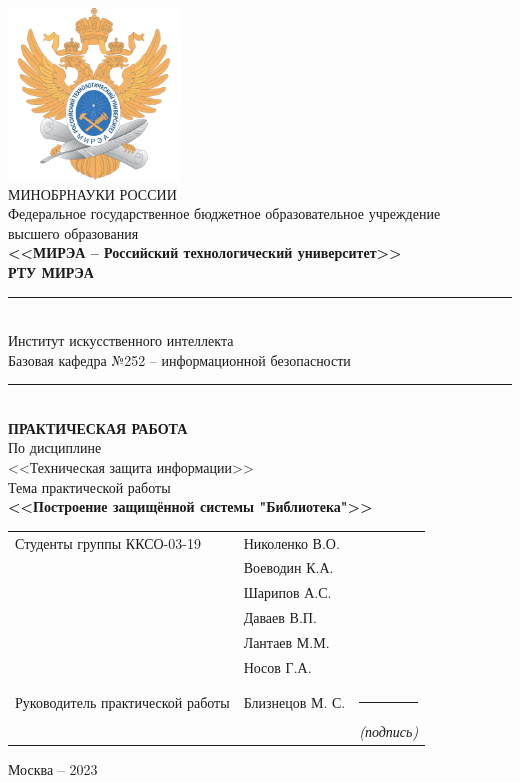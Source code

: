 \documentclass[utf8,14pt,a4paper,oneside,russian]{book}
\begin{document}
\thispagestyle{empty}
\small
\begin{center}
  \includegraphics[width=4.55cm]{logo_mirea}\\
  \MakeUppercase{Минобрнауки России}\\[1em]
  Федеральное государственное бюджетное образовательное учреждение\\
  высшего образования\\[0.5em]
  \textbf{<<МИРЭА -- Российский технологический университет>>}\\
  \textbf{РТУ МИРЭА}\\
  \rule{\textwidth}{0.75pt}\\
  Институт искусственного интеллекта\\
  Базовая кафедра №252 -- информационной безопасности\\[-0.45em]
  \rule{\textwidth}{0.75pt}\\[5em]
  \normalsize\MakeUppercase{\textbf{Практическая работа}}\small\\[0.5em]
  По дисциплине\\ <<Техническая защита информации>>\\[1.5em]
  Тема практической работы\\ \textbf{<<Построение защищённой системы "Библиотека">>} \\[3em]
  \begin{tabular}{p{7cm}p{6cm}c}
    Студенты группы ККСО-03-19       & Николенко В.О.                                          \\
                                     & Воеводин К.А.                                           \\
                                     & Шарипов А.С.                                            \\
                                     & Даваев В.П.                                             \\
                                     & Лантаев М.М.                                            \\
                                     & Носов Г.А.                                              \\
                                     &                                                         \\
    Руководитель практической работы & Близнецов М. С. & \rule{2cm}{0.75pt}                    \\[-0.5em]
                                     &                 & \footnotesize\textit{(подпись)}\small \\[5em]
  \end{tabular}
  \vfill
  Москва -- 2023
\end{center}
\normalsize
\newpage
\end{document}
